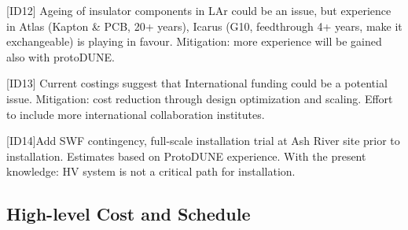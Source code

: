 [ID12] Ageing of insulator components in LAr could be an issue,  but  experience in Atlas (Kapton \& PCB, 20+ years), Icarus (G10, feedthrough 4+ years, make it exchangeable) is playing in favour. Mitigation: more experience will be gained also with protoDUNE.

[ID13] Current costings suggest that International funding could be a potential issue. Mitigation: cost reduction through design optimization and scaling. Effort to include more international collaboration institutes. 

[ID14]Add SWF contingency, full-scale installation trial at Ash River site prior to installation. Estimates based on ProtoDUNE experience. With the present knowledge: HV system is not a critical path for installation.
\subsection{High-level Cost and Schedule}
\label{sec:fdsp-hv-org-cs}





